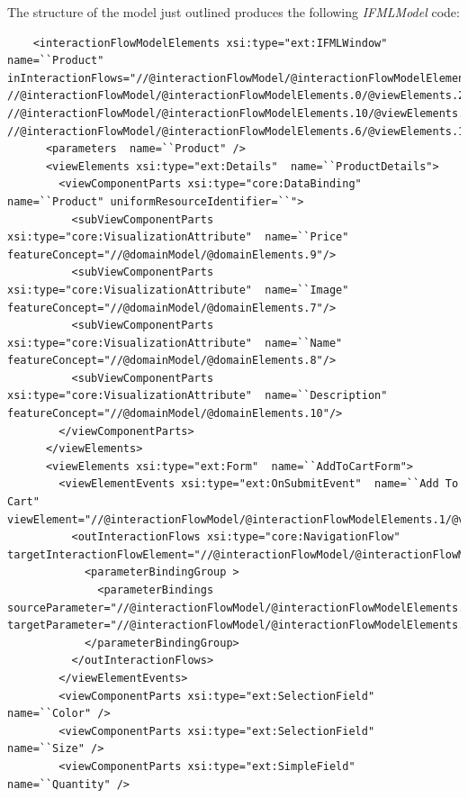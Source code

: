 The structure of the model just outlined produces the following \textit{IFMLModel} code:
\vspace{0.5cm}
\lstset{language=XML}
\begin{lstlisting} 
    <interactionFlowModelElements xsi:type="ext:IFMLWindow"  name=``Product" inInteractionFlows="//@interactionFlowModel/@interactionFlowModelElements.1/@viewElements.2/@viewElementEvents.0/@outInteractionFlows.0 //@interactionFlowModel/@interactionFlowModelElements.0/@viewElements.2/@viewElementEvents.0/@outInteractionFlows.0 //@interactionFlowModel/@interactionFlowModelElements.10/@viewElements.0/@viewElementEvents.0/@outInteractionFlows.0 //@interactionFlowModel/@interactionFlowModelElements.6/@viewElements.1/@viewElements.0/@viewElementEvents.0/@outInteractionFlows.0">
      <parameters  name=``Product" />
      <viewElements xsi:type="ext:Details"  name=``ProductDetails">
        <viewComponentParts xsi:type="core:DataBinding"  name=``Product" uniformResourceIdentifier=``">
          <subViewComponentParts xsi:type="core:VisualizationAttribute"  name=``Price" featureConcept="//@domainModel/@domainElements.9"/>
          <subViewComponentParts xsi:type="core:VisualizationAttribute"  name=``Image" featureConcept="//@domainModel/@domainElements.7"/>
          <subViewComponentParts xsi:type="core:VisualizationAttribute"  name=``Name" featureConcept="//@domainModel/@domainElements.8"/>
          <subViewComponentParts xsi:type="core:VisualizationAttribute"  name=``Description" featureConcept="//@domainModel/@domainElements.10"/>
        </viewComponentParts>
      </viewElements>
      <viewElements xsi:type="ext:Form"  name=``AddToCartForm">
        <viewElementEvents xsi:type="ext:OnSubmitEvent"  name=``Add To Cart" viewElement="//@interactionFlowModel/@interactionFlowModelElements.1/@viewElements.1">
          <outInteractionFlows xsi:type="core:NavigationFlow"  targetInteractionFlowElement="//@interactionFlowModel/@interactionFlowModelElements.9">
            <parameterBindingGroup >
              <parameterBindings  sourceParameter="//@interactionFlowModel/@interactionFlowModelElements.1/@viewElements.1/@viewComponentParts.2" targetParameter="//@interactionFlowModel/@interactionFlowModelElements.1/@viewElements.1/@viewComponentParts.2"/>
            </parameterBindingGroup>
          </outInteractionFlows>
        </viewElementEvents>
        <viewComponentParts xsi:type="ext:SelectionField"  name=``Color" />
        <viewComponentParts xsi:type="ext:SelectionField"  name=``Size" />
        <viewComponentParts xsi:type="ext:SimpleField"  name=``Quantity" />

\end{lstlisting}
